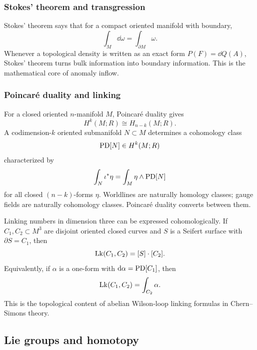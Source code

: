\subsubsection{Stokes' theorem and transgression}

Stokes' theorem says that for a compact oriented manifold with boundary,
\begin{equation}
  \int_M \dd\omega = \int_{\partial M} \omega.
\end{equation}
Whenever a topological density is written as an exact form $P(F)=\dd Q(A)$, Stokes' theorem turns bulk information into boundary information. This is the mathematical core of anomaly inflow.

\subsubsection{Poincaré duality and linking}

For a closed oriented $n$-manifold $M$, Poincaré duality gives
\begin{equation}
  H^k(M;R) \cong H_{n-k}(M;R).
\end{equation}
A codimension-$k$ oriented submanifold $N \subset M$ determines a cohomology class
\begin{equation}
  \operatorname{PD}[N] \in H^k(M;R)
\end{equation}
characterized by
\begin{equation}
  \int_N \iota^*\eta = \int_M \eta \wedge \operatorname{PD}[N]
\end{equation}
for all closed $(n-k)$-forms $\eta$. Worldlines are naturally homology classes; gauge fields are naturally cohomology classes. Poincaré duality converts between them.

Linking numbers in dimension three can be expressed cohomologically. If $C_1,C_2 \subset M^3$ are disjoint oriented closed curves and $S$ is a Seifert surface with $\partial S=C_1$, then
\begin{equation}
  \operatorname{Lk}(C_1,C_2)= [S]\cdot [C_2].
\end{equation}
Equivalently, if $\alpha$ is a one-form with $\mathrm{d}\alpha = \operatorname{PD}[C_1]$, then
\begin{equation}
  \operatorname{Lk}(C_1,C_2)=\int_{C_2} \alpha.
\end{equation}
This is the topological content of abelian Wilson-loop linking formulas in Chern--Simons theory.

\subsection{Lie groups and homotopy}

